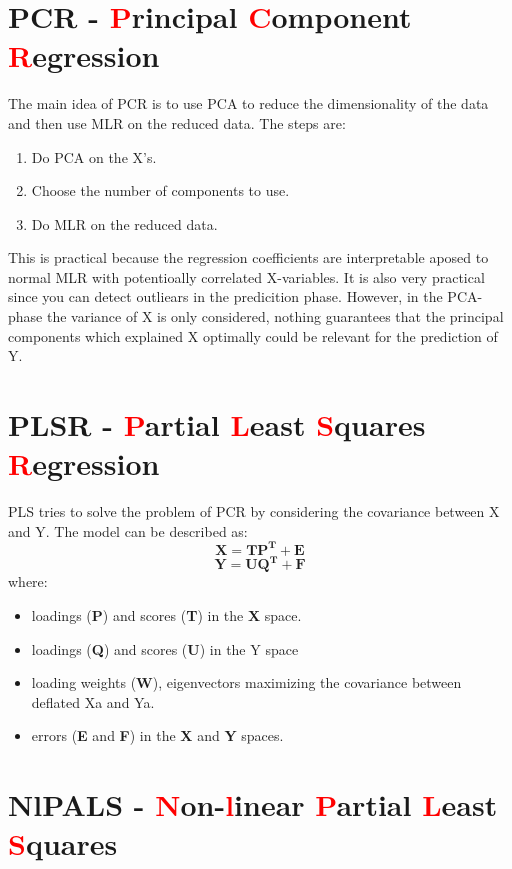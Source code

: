 \section{PCR - \textcolor{red}{P}rincipal \textcolor{red}{C}omponent \textcolor{red}{R}egression}
The main idea of PCR is to use PCA to reduce the dimensionality of the data and then use MLR on the reduced data. The steps are:
\begin{enumerate}
    \item Do PCA on the X's.
    \item Choose the number of components to use.
    \item Do MLR on the reduced data.
\end{enumerate}
This is practical because the regression coefficients are interpretable aposed to normal MLR with potentioally correlated X-variables. It is also very practical since you can detect outliears in the predicition phase. However, in the PCA-phase the variance of X is only considered, nothing guarantees that the principal components which explained X
optimally could be relevant for the prediction of Y. \newline

\section{PLSR - \textcolor{red}{P}artial \textcolor{red}{L}east \textcolor{red}{S}quares \textcolor{red}{R}egression}
PLS tries to solve the problem of PCR by considering the covariance between X and Y. The model can be described as:
\begin{equation}
    \mathbf{
    X = TP^T + E
    }
\end{equation}
\begin{equation}
    \mathbf{
    Y = UQ^T + F
    }
\end{equation}
where:
\begin{itemize}
    \item loadings (\textbf{P}) and scores (\textbf{T}) in the \textbf{X} space.
    \item loadings (\textbf{Q}) and scores (\textbf{U}) in the Y space
    \item loading weights (\textbf{W}), eigenvectors maximizing the covariance between
    deflated Xa and Ya.
    \item errors (\textbf{E} and \textbf{F}) in the \textbf{X} and \textbf{Y} spaces.
\end{itemize}
\section{NlPALS - \textcolor{red}{N}on-\textcolor{red}{l}inear \textcolor{red}{P}artial \textcolor{red}{L}east \textcolor{red}{S}quares}

